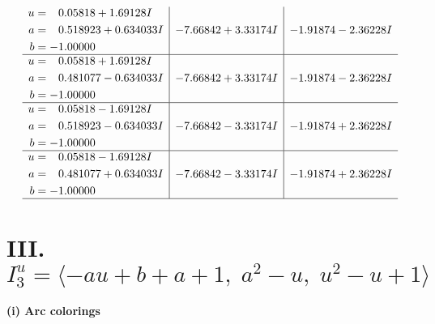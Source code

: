 \documentclass[1p]{elsarticle_modified}
\theoremstyle{definition}
\begin{document}
$$\begin{array}{c|c|c}
\begin{aligned}
u &= \phantom{-}0.05818 + 1.69128 I \\
a &= \phantom{-}0.518923 + 0.634033 I \\
b &= -1.00000\phantom{ +0.000000I}\end{aligned}
 & -7.66842 + 3.33174 I & -1.91874 - 2.36228 I \\ \hline\begin{aligned}
u &= \phantom{-}0.05818 + 1.69128 I \\
a &= \phantom{-}0.481077 - 0.634033 I \\
b &= -1.00000\phantom{ +0.000000I}\end{aligned}
 & -7.66842 + 3.33174 I & -1.91874 - 2.36228 I \\ \hline\begin{aligned}
u &= \phantom{-}0.05818 - 1.69128 I \\
a &= \phantom{-}0.518923 - 0.634033 I \\
b &= -1.00000\phantom{ +0.000000I}\end{aligned}
 & -7.66842 - 3.33174 I & -1.91874 + 2.36228 I \\ \hline\begin{aligned}
u &= \phantom{-}0.05818 - 1.69128 I \\
a &= \phantom{-}0.481077 + 0.634033 I \\
b &= -1.00000\phantom{ +0.000000I}\end{aligned}
 & -7.66842 - 3.33174 I & -1.91874 + 2.36228 I\\
 \hline 
 \end{array}$$\newpage\newpage\renewcommand{\arraystretch}{1}
\centering \section*{III. $I^u_{3}= \langle - a u+b+a+1,\;a^2- u,\;u^2- u+1 \rangle$}
\flushleft \textbf{(i) Arc colorings}\\
\end{document}
